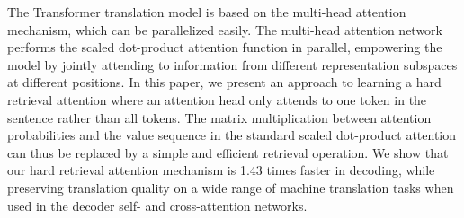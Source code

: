 The Transformer translation model is based on the multi-head attention mechanism, which can be parallelized easily. The multi-head attention network performs the scaled dot-product attention function in parallel, empowering the model by jointly attending to information from different representation subspaces at different positions. In this paper, we present an approach to learning a hard retrieval attention where an attention head only attends to one token in the sentence rather than all tokens. The matrix multiplication between attention probabilities and the value sequence in the standard scaled dot-product attention can thus be replaced by a simple and efficient retrieval operation. We show that our hard retrieval attention mechanism is 1.43 times faster in decoding, while preserving translation quality on a wide range of machine translation tasks when used in the decoder self- and cross-attention networks.
